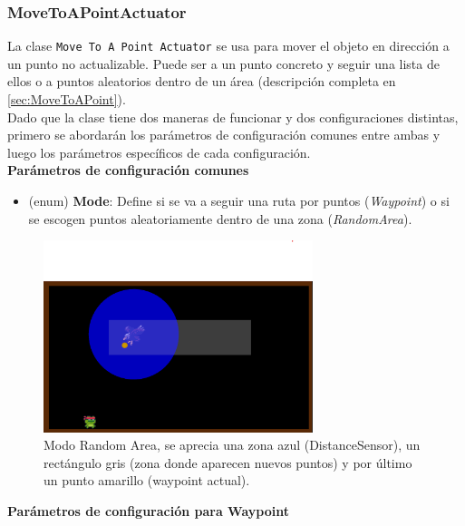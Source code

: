 \subsubsection{MoveToAPointActuator}
La clase \texttt{Move To A Point Actuator} se usa para mover el objeto en dirección a un punto no actualizable. Puede ser a un punto concreto y seguir una lista de ellos o a puntos aleatorios dentro de un área (descripción completa en {\ref{sec:MoveToAPoint}}).\\
Dado que la clase tiene dos maneras de funcionar y dos configuraciones distintas, primero se abordarán los parámetros de configuración comunes entre ambas y luego los parámetros específicos de cada configuración.\\

\textbf{Parámetros de configuración comunes}
\begin{itemize} 
	\item (enum) \textbf{Mode}: Define si se va a seguir una ruta por puntos (\textit{Waypoint}) o si se escogen puntos aleatoriamente dentro de una zona (\textit{RandomArea}).
\end{itemize}	
\begin{figure}[t]
		\centering
		\includegraphics[width = 0.7\textwidth]{Imagenes/MoveToAPointRandomArea.png}
		\caption{Modo Random Area, se aprecia una zona azul (DistanceSensor), un rectángulo gris (zona donde aparecen nuevos puntos) y por último un punto amarillo (waypoint actual).}
		\label{fig:MoveToAPointRandomArea_Image}
\end{figure}
\textbf{Parámetros de configuración para Waypoint}
